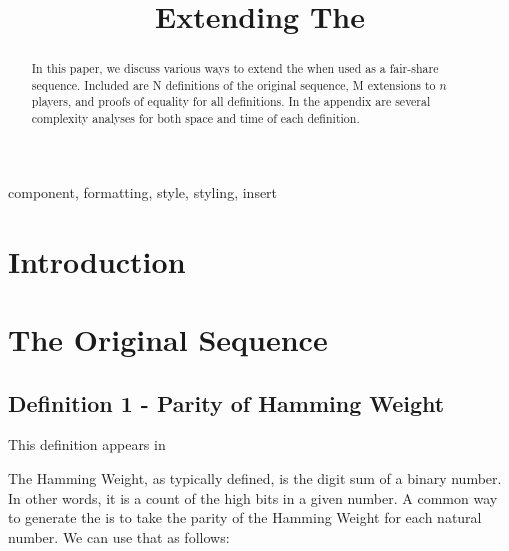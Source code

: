 \documentclass[conference]{IEEEtran}
\begin{document}
\title{Extending The \TMS}

\author{
\and
{}
}

\maketitle

\begin{abstract}
In this paper, we discuss various ways to extend the \TMS \cite{OEIS-TMS} when used as a fair-share sequence. Included are N definitions of the original sequence, M extensions to $n$ players, and proofs of equality for all definitions. In the appendix are several complexity analyses for both space and time of each definition.
\end{abstract}

\begin{IEEEkeywords}
component, formatting, style, styling, insert
\end{IEEEkeywords}

\section{Introduction}

\section{The Original Sequence}

\subsection{Definition 1 - Parity of Hamming Weight}

This definition appears in \cite{Spiegelhofer_2020, Allouche-Shallit_1999}

The Hamming Weight, as typically defined, is the digit sum of a binary number. In other words, it is a count of the high bits in a given number. A common way to generate the \TMS is to take the parity of the Hamming Weight for each natural number. We can use that as follows:
\end{document}
